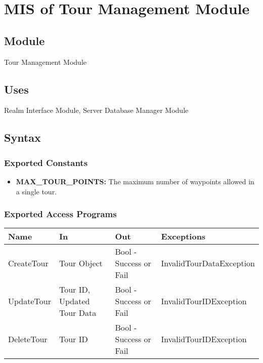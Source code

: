 \documentclass[12pt, titlepage]{article}
\begin{document}
\newpage

\section{MIS of Tour Management Module} \label{TourManagementModule}

\subsection{Module}

Tour Management Module

\subsection{Uses}

Realm Interface Module, Server Database Manager Module

\subsection{Syntax}

\subsubsection{Exported Constants}

\begin{itemize}
  \item \textbf{MAX\_TOUR\_POINTS:} The maximum number of waypoints allowed in a single tour.
\end{itemize}

\subsubsection{Exported Access Programs}

\begin{center}
  \begin{tabular}{p{2.5cm} p{4cm} p{4cm} p{5cm}}
    \hline
    \textbf{Name} & \textbf{In}                & \textbf{Out}           & \textbf{Exceptions}      \\
    \hline
    CreateTour    & Tour Object                & Bool - Success or Fail & InvalidTourDataException \\
    \hline
    UpdateTour    & Tour ID, Updated Tour Data & Bool - Success or Fail & InvalidTourIDException   \\
    \hline
    DeleteTour    & Tour ID                    & Bool - Success or Fail & InvalidTourIDException   \\
    \hline
  \end{tabular}
\end{center}
\end{document}
